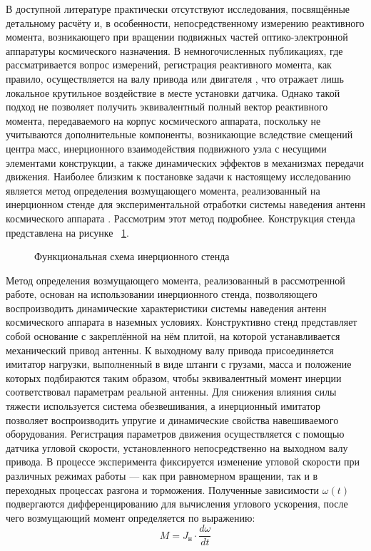 В доступной литературе практически отсутствуют исследования, посвящённые детальному расчёту и, в особенности, непосредственному измерению реактивного момента, возникающего при вращении подвижных частей оптико-электронной аппаратуры космического назначения. В немногочисленных публикациях, где рассматривается вопрос измерений, регистрация реактивного момента, как правило, осуществляется на валу привода или двигателя \cite{Rayanov2020}, что отражает лишь локальное крутильное воздействие в месте установки датчика. Однако такой подход не позволяет получить эквивалентный полный вектор реактивного момента, передаваемого на корпус космического аппарата, поскольку не учитываются дополнительные компоненты, возникающие вследствие смещений центра масс, инерционного взаимодействия подвижного узла с несущими элементами конструкции, а также динамических эффектов в механизмах передачи движения. Наиболее близким к постановке задачи к настоящему исследованию является метод определения возмущающего момента, реализованный на инерционном стенде для экспериментальной отработки системы наведения антенн космического аппарата \cite{Goncharuk2013}. Рассмотрим этот метод подробнее. Конструкция стенда представлена на рисунке ~\cref{fig:stand}.
\begin{figure}[ht] 
	\caption{Функциональная схема инерционного стенда}
	\label{fig:stand} 
\end{figure}

Метод определения возмущающего момента, реализованный в рассмотренной работе, %
основан на использовании инерционного стенда, позволяющего воспроизводить динамические характеристики системы наведения антенн космического аппарата в наземных условиях. Конструктивно стенд представляет собой основание с закреплённой на нём плитой, на которой устанавливается механический привод антенны. К выходному валу привода присоединяется имитатор нагрузки, выполненный в виде штанги с грузами, масса и положение которых подбираются таким образом, чтобы эквивалентный момент инерции соответствовал параметрам реальной антенны. Для снижения влияния силы тяжести используется система обезвешивания, а инерционный имитатор позволяет воспроизводить упругие и динамические свойства навешиваемого оборудования. Регистрация параметров движения осуществляется с помощью датчика угловой скорости, установленного непосредственно на выходном валу привода. В процессе эксперимента фиксируется изменение угловой скорости при различных режимах работы — как при равномерном вращении, так и в переходных процессах разгона и торможения. Полученные зависимости $\omega(t)$ подвергаются дифференцированию для вычисления углового ускорения, после чего возмущающий момент определяется по выражению:
\begin{equation}
	\label{eq:eq_M_disturb}
	M=J_{\text{н}}\cdot \frac{d\omega}{dt}
\end{equation}

